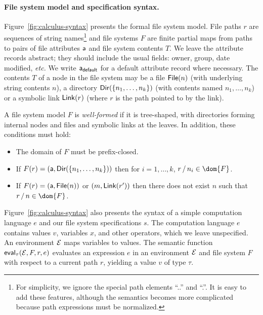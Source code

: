 \paragraph*{File system model and specification syntax.}
%
Figure~\ref{fig:calculus-syntax} presents the formal file system
model.  File paths $r$ are sequences of string names\footnote{For
  simplicity, we ignore the special path elements ``..'' and ``.''.
  It is easy to add these features, although the semantics becomes
  more complicated because path expressions must be normalized.}  and
file systems $F$ are finite partial maps from paths to pairs of file
attributes $\mathsf{a}$ and file system contents $T$.  We leave the
attribute records abstract; they should include the usual fields:
owner, group, date modified, {\it etc.}  We write $\mathsf{a}_{\mathsf{default}}$ for
a default attribute record where necessary.  The contents $T$ of a
node in the file system may be a file $\mathsf{File}(n)$ (with underlying
string contents $n$), a directory $\mathsf{Dir}( \{ n_1,\dots,n_k \} )$ (with
contents named $n_1, \ldots, n_k$) or a symbolic link $\mathsf{Link}(r)$
(where $r$ is the path pointed to by the link).

A file system model $F$ is {\em well-formed} if it is tree-shaped,
with directories forming internal nodes and files and symbolic links
at the leaves.  In addition, these conditions must hold:
\begin{itemize}
\item The domain of $F$ must be prefix-closed.
\item If $F(r) = (\mathsf{a},\mathsf{Dir}( \{ n_1,\dots,n_k \} ))$ then for $i=1,\ldots,k$,
$\PCons{r}{n_i} \in \dom{F}$.
\item  If $F(r) = (\mathsf{a},\mathsf{File}(n))$ or $(m,\mathsf{Link}(r'))$ then 
there does not exist $n$ such that $\PCons{r}{n} \in \dom{F}$.
\end{itemize}

Figure~\ref{fig:calculus-syntax} also presents the syntax of a simple
computation language $e$ and our file system specifications $s$.  The
computation language $e$ contains values $v$, variables $x$, and other
operators, which we leave unspecified.  An environment $\mathcal{E}$ maps
variables to values.  The semantic function $\mathsf{eval}_{\tau}(\mathcal{E},F,r,e)$
evaluates an expression $e$ in an environment $\mathcal{E}$ and file system
$F$ with respect to a current path $r$, yielding a value $v$ of type
$\tau$.

